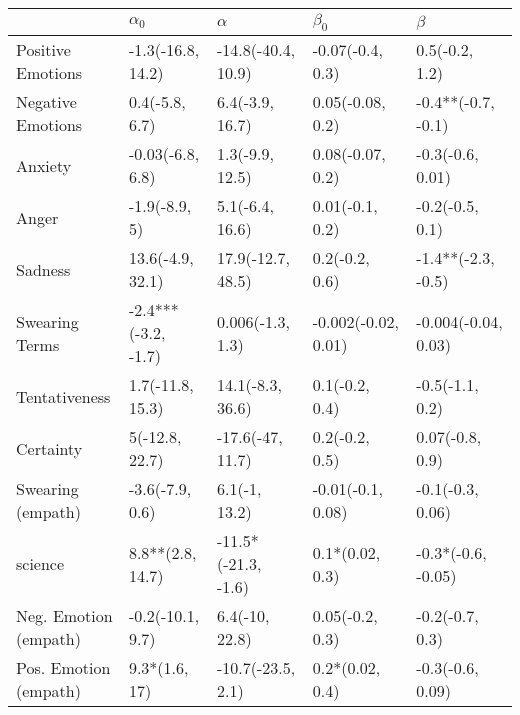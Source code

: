 \begin{tabular}{lllll}
\toprule
{} &           $\alpha_0$ &             $\alpha$ &            $\beta_0$ &              $\beta$ \\
\midrule
Positive Emotions     &    -1.3(-16.8, 14.2) &   -14.8(-40.4, 10.9) &     -0.07(-0.4, 0.3) &       0.5(-0.2, 1.2) \\
Negative Emotions     &       0.4(-5.8, 6.7) &      6.4(-3.9, 16.7) &     0.05(-0.08, 0.2) &   -0.4**(-0.7, -0.1) \\
Anxiety               &     -0.03(-6.8, 6.8) &      1.3(-9.9, 12.5) &     0.08(-0.07, 0.2) &     -0.3(-0.6, 0.01) \\
Anger                 &        -1.9(-8.9, 5) &      5.1(-6.4, 16.6) &      0.01(-0.1, 0.2) &      -0.2(-0.5, 0.1) \\
Sadness               &     13.6(-4.9, 32.1) &    17.9(-12.7, 48.5) &       0.2(-0.2, 0.6) &   -1.4**(-2.3, -0.5) \\
Swearing Terms        &  -2.4***(-3.2, -1.7) &     0.006(-1.3, 1.3) &  -0.002(-0.02, 0.01) &  -0.004(-0.04, 0.03) \\
Tentativeness         &     1.7(-11.8, 15.3) &     14.1(-8.3, 36.6) &       0.1(-0.2, 0.4) &      -0.5(-1.1, 0.2) \\
Certainty             &       5(-12.8, 22.7) &     -17.6(-47, 11.7) &       0.2(-0.2, 0.5) &      0.07(-0.8, 0.9) \\
Swearing (empath)     &      -3.6(-7.9, 0.6) &        6.1(-1, 13.2) &    -0.01(-0.1, 0.08) &     -0.1(-0.3, 0.06) \\
science               &     8.8**(2.8, 14.7) &  -11.5*(-21.3, -1.6) &      0.1*(0.02, 0.3) &   -0.3*(-0.6, -0.05) \\
Neg. Emotion (empath) &     -0.2(-10.1, 9.7) &       6.4(-10, 22.8) &      0.05(-0.2, 0.3) &      -0.2(-0.7, 0.3) \\
Pos. Emotion (empath) &        9.3*(1.6, 17) &    -10.7(-23.5, 2.1) &      0.2*(0.02, 0.4) &     -0.3(-0.6, 0.09) \\
\bottomrule
\end{tabular}
